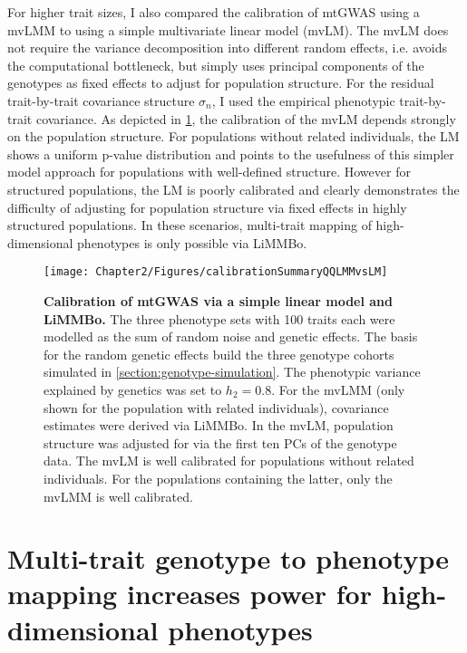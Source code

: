 For higher trait sizes, I also compared the calibration of mtGWAS using a mvLMM to using a simple multivariate linear model (mvLM). The mvLM does not require the variance decomposition into different random effects, i.e. avoids the computational bottleneck, but simply uses principal components of the genotypes as fixed effects to adjust for population structure. For the residual trait-by-trait covariance structure \(\sigma_n\), I used the empirical phenotypic trait-by-trait covariance. As depicted in \cref{fig:calibration-LM}, the calibration of the mvLM depends strongly on the population structure. For populations without related individuals, the LM shows a uniform p-value distribution and points to the usefulness of this simpler model approach for populations with well-defined structure. However for structured populations, the LM is poorly calibrated and clearly demonstrates the difficulty of adjusting for population structure via fixed effects in highly structured populations. In these scenarios, multi-trait mapping of high-dimensional phenotypes is only possible via LiMMBo. 
%
\begin{figure}[h!]
	\centering	
	\texttt{[image: Chapter2/Figures/calibrationSummaryQQLMMvsLM]}\\
	\caption[\textbf{Calibration of mtGWAS via a simple linear model and a linear mixed model. }]{\textbf{Calibration of mtGWAS via a simple linear model and LiMMBo. } The three phenotype sets with \num{100} traits each were modelled as the sum of random noise and genetic effects. The basis for the random genetic effects build the three genotype cohorts simulated in \cref{section:genotype-simulation}. The phenotypic variance explained by genetics was set to \(h_2=0.8\). For the mvLMM (only shown for the population with related individuals), covariance estimates were derived via LiMMBo. In the mvLM, population structure was adjusted for via the first ten PCs of the genotype data. The mvLM is well calibrated for populations without related individuals. For the populations containing the latter, only the mvLMM is well calibrated. }
	  \label{fig:calibration-LM}%
\end{figure}

\section{Multi-trait genotype to phenotype mapping increases power for high-dimensional phenotypes}
\label{section:power-limmbo}

